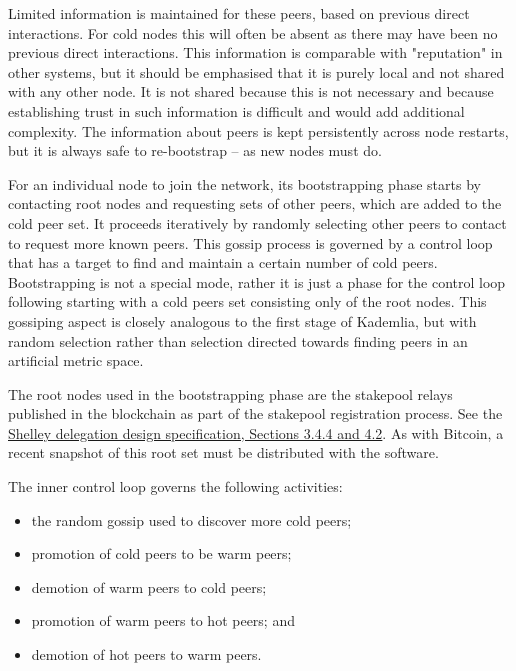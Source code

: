 \documentclass[11pt,a4paper]{article}
\begin{document}
Limited information is maintained for these peers, based on previous
direct interactions. For cold nodes this will often be absent as there
may have been no previous direct interactions. This information is
comparable with "reputation" in other systems, but it should be
emphasised that it is purely local and not shared with any other node.
It is not shared because this is not necessary and because establishing
trust in such information is difficult and would add additional
complexity. The information about peers is kept persistently across node
restarts, but it is always safe to re-bootstrap -- as new nodes must do.

For an individual node to join the network, its bootstrapping phase
starts by contacting root nodes and requesting sets of other peers,
which are added to the cold peer set. It proceeds iteratively by
randomly selecting other peers to contact to request more known peers.
This gossip process is governed by a control loop that has a target to
find and maintain a certain number of cold peers. Bootstrapping is not a
special mode, rather it is just a phase for the control loop following
starting with a cold peers set consisting only of the root nodes. This
gossiping aspect is closely analogous to the first stage of Kademlia,
but with random selection rather than selection directed towards finding
peers in an artificial metric space.

The root nodes used in the bootstrapping phase are the stakepool relays
published in the blockchain as part of the stakepool registration
process. See the
\href{https://hydra.iohk.io/job/Cardano/cardano-ledger-specs/delegationDesignSpec/latest/download-by-type/doc-pdf/delegation_design_spec}{{Shelley
delegation design specification, Sections 3.4.4 and 4.2}}. As with
Bitcoin, a recent snapshot of this root set must be distributed with the
software.

The inner control loop governs the following activities:

\begin{itemize}
\item
  the random gossip used to discover more cold peers;
\item
  promotion of cold peers to be warm peers;
\item
  demotion of warm peers to cold peers;
\item
  promotion of warm peers to hot peers; and
\item
  demotion of hot peers to warm peers.
\end{itemize}
\end{document}
